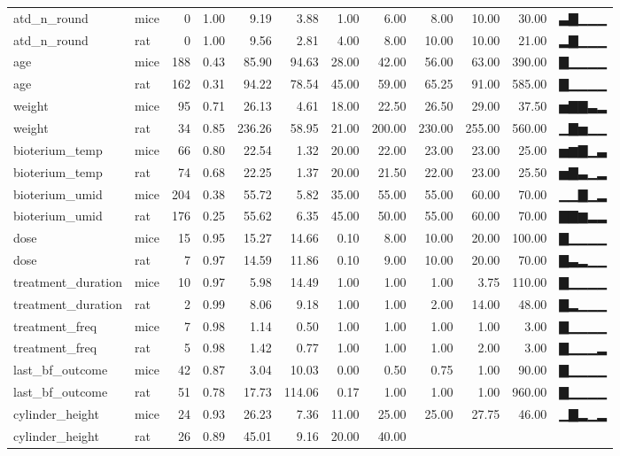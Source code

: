 \documentclass[
]{article}
\begin{document}
\begin{longtable}[]{@{}llrrrrrrrrrl@{}}
atd\_n\_round & mice & 0 & 1.00 & 9.19 & 3.88 & 1.00 & 6.00 & 8.00 &
10.00 & 30.00 & ▃▇▁▁▁ \\
atd\_n\_round & rat & 0 & 1.00 & 9.56 & 2.81 & 4.00 & 8.00 & 10.00 &
10.00 & 21.00 & ▂▇▁▁▁ \\
age & mice & 188 & 0.43 & 85.90 & 94.63 & 28.00 & 42.00 & 56.00 & 63.00
& 390.00 & ▇▁▁▁▁ \\
age & rat & 162 & 0.31 & 94.22 & 78.54 & 45.00 & 59.00 & 65.25 & 91.00 &
585.00 & ▇▁▁▁▁ \\
weight & mice & 95 & 0.71 & 26.13 & 4.61 & 18.00 & 22.50 & 26.50 & 29.00
& 37.50 & ▅▇▇▃▂ \\
weight & rat & 34 & 0.85 & 236.26 & 58.95 & 21.00 & 200.00 & 230.00 &
255.00 & 560.00 & ▁▇▅▁▁ \\
bioterium\_temp & mice & 66 & 0.80 & 22.54 & 1.32 & 20.00 & 22.00 &
23.00 & 23.00 & 25.00 & ▅▆▇▁▃ \\
bioterium\_temp & rat & 74 & 0.68 & 22.25 & 1.37 & 20.00 & 21.50 & 22.00
& 23.00 & 25.50 & ▅▇▃▁▂ \\
bioterium\_umid & mice & 204 & 0.38 & 55.72 & 5.82 & 35.00 & 55.00 &
55.00 & 60.00 & 70.00 & ▁▁▇▁▂ \\
bioterium\_umid & rat & 176 & 0.25 & 55.62 & 6.35 & 45.00 & 50.00 &
55.00 & 60.00 & 70.00 & ▇▇▆▂▂ \\
dose & mice & 15 & 0.95 & 15.27 & 14.66 & 0.10 & 8.00 & 10.00 & 20.00 &
100.00 & ▇▁▁▁▁ \\
dose & rat & 7 & 0.97 & 14.59 & 11.86 & 0.10 & 9.00 & 10.00 & 20.00 &
70.00 & ▇▃▂▁▁ \\
treatment\_duration & mice & 10 & 0.97 & 5.98 & 14.49 & 1.00 & 1.00 &
1.00 & 3.75 & 110.00 & ▇▁▁▁▁ \\
treatment\_duration & rat & 2 & 0.99 & 8.06 & 9.18 & 1.00 & 1.00 & 2.00
& 14.00 & 48.00 & ▇▂▁▁▁ \\
treatment\_freq & mice & 7 & 0.98 & 1.14 & 0.50 & 1.00 & 1.00 & 1.00 &
1.00 & 3.00 & ▇▁▁▁▁ \\
treatment\_freq & rat & 5 & 0.98 & 1.42 & 0.77 & 1.00 & 1.00 & 1.00 &
2.00 & 3.00 & ▇▁▁▁▂ \\
last\_bf\_outcome & mice & 42 & 0.87 & 3.04 & 10.03 & 0.00 & 0.50 & 0.75
& 1.00 & 90.00 & ▇▁▁▁▁ \\
last\_bf\_outcome & rat & 51 & 0.78 & 17.73 & 114.06 & 0.17 & 1.00 &
1.00 & 1.00 & 960.00 & ▇▁▁▁▁ \\
cylinder\_height & mice & 24 & 0.93 & 26.23 & 7.36 & 11.00 & 25.00 &
25.00 & 27.75 & 46.00 & ▁▇▂▁▂ \\
cylinder\_height & rat & 26 & 0.89 & 45.01 & 9.16 & 20.00 & 40.00 &

\end{longtable}
\end{document}
